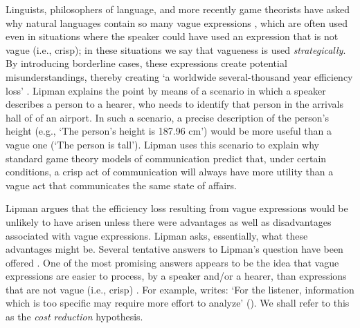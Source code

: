 \documentclass[ %
  graybox       %
 ,envcountchap  %
 ,sectrefs      %
]{svmono}
\begin{document}
Linguists, philosophers of language, and more recently game theorists have asked why natural languages contain so many vague expressions \citet{Lipman:2000fk, lipmanvague}, which are
often used even in situations where the speaker could have used an expression that is not vague (i.e., crisp); in these situations we say that vagueness is used \emph{strategically}.
By introducing borderline cases, these expressions create potential misunderstandings, thereby creating `a worldwide several-thousand year efficiency loss' \citet[][p.~1]{lipmanvague}.
Lipman explains the point by means of a scenario in which a speaker describes a person to a hearer, who needs to identify that person in the arrivals hall of of an airport.
In such a scenario, a precise description of the person's height (e.g., `The person's height is 187.96 cm') would be more useful than a vague one (`The person is tall').
Lipman uses this scenario to explain why standard game theory models of communication \citep[e.g.,][]{Crawford:1982lr} predict that, under certain conditions, a crisp act of communication will always have more utility than a vague act that communicates the same state of affairs.

Lipman argues that the efficiency loss resulting from vague expressions would be unlikely to have arisen unless there were advantages as well as disadvantages associated with vague expressions.
Lipman asks, essentially, what these advantages might be.
Several tentative answers to Lipman's question have been offered \citep[see][]{van2009utility, vanDeemterBook}.
One of the most promising answers appears to be the idea that vague expressions are easier to process, by a speaker and/or a hearer, than expressions that are not vague (i.e., crisp) \citep[e.g.,][]{lipmanvague,De-Jaegher:2003lr,vanrooij2003lr}.
For example, \citeauthor{lipmanvague} writes: `For the listener, information which is too specific may require more effort to analyze' (\citeyear[][p.~11]{lipmanvague}).
We shall refer to this as the \emph{cost reduction} hypothesis.
\end{document}
